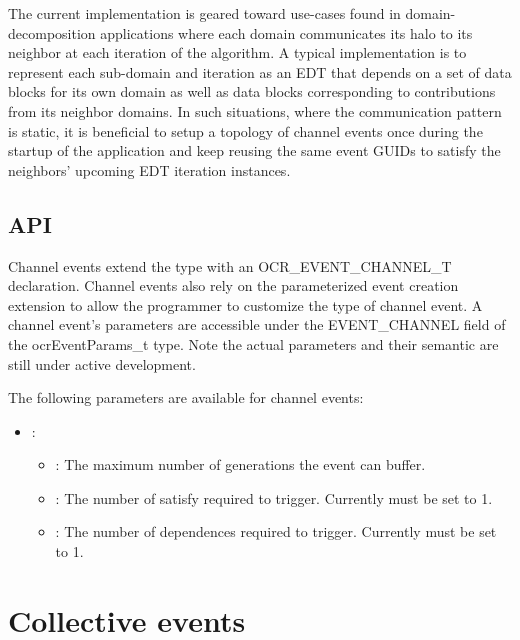 The current implementation is geared toward use-cases found in
domain-decomposition applications where each domain communicates its
halo to its neighbor at each iteration of the algorithm. A typical
implementation is to represent each sub-domain and iteration as an EDT
that depends on a set of data blocks for its own domain as well as
data blocks corresponding to
contributions from its neighbor domains. In such situations, where the
communication pattern is static, it
is beneficial to setup a topology of channel events once during the
startup of the application and keep reusing the same event GUIDs to
satisfy the neighbors' upcoming EDT iteration instances.

\subsection{API}

Channel events extend the
\hyperlink{type_ocrEventTypes_t}{} type
with an OCR\_EVENT\_CHANNEL\_T declaration. Channel events also rely
on the parameterized event creation extension to allow the programmer
to customize the type of channel event. A channel event's parameters are
accessible under the EVENT\_CHANNEL field of the ocrEventParams\_t
type. Note the actual parameters and their semantic are still under
active development.

The following parameters are available for channel events:
\begin{itemize}
\item {}:
\begin{itemize}
\item {}: The maximum number of generations the event can buffer.
\item {}: The number of satisfy required to trigger.
  Currently must be set to 1.
\item {}: The number of dependences required to
  trigger. Currently must be set to 1.
\end{itemize}
\end{itemize}

\section{Collective events}
\label{sec:collectiveEvents}

